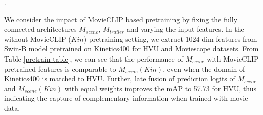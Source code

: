 \begin{table}[h!]
\centering
{}
\vspace{3mm}
\caption{Impact of MovieCLIP pretrained features vs Kinetics pretrained features for $M_{scene}$ (HVU) and $M_{trailer}$ (Moviescope). Results reported are mean average precision (\textbf{mAP}) values. $Model(Kin)$: Model with Kinetics400 pretrained features, where $Model \in \{M_{scene},M_{trailer}\}$ }
\label{pretrain table}.
\end{table}
We consider the impact of MovieCLIP based pretraining by fixing the fully connected architectures $M_{scene}$, $M_{trailer}$ and varying the input features. In the without MovieCLIP ($Kin$) pretraining setting, we extract 1024 dim features from Swin-B model pretrained on Kinetics400 for HVU and Moviescope datasets. 
From Table \ref{pretrain table}, we can see that the performance of $M_{scene}$ with MovieCLIP pretrained features is comparable to $M_{scene}(Kin)$, even when the domain of Kinetics400 \cite{kinetics400} is matched to HVU. Further, late fusion of prediction logits of $M_{scene}$ and  $M_{scene}(Kin)$ with equal weights improves the mAP to 57.73 for HVU, thus indicating the capture of complementary information when trained with movie data.

